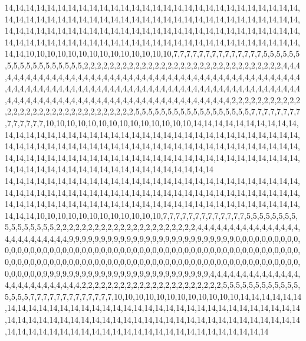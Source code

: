 14,14,14,14,14,14,14,14,14,14,14,14,14,14,14,14,14,14,14,14,14,14,14,14,14,14,14,14,14,14,14,14,14,14,14,14,14,14,14,14,14,14,14,14,14,14,14,14,14,14,14,14,14,14,14,14,14,14,14,14,14,14,14,14,14,14,14,14,14,14,14,14,14,14,14,14,14,14,14,14,14,14,14,14,14,14,14,14,14,14,14,14,14,14,14,14,14,14,14,14,14,14,14,14,14,14,14,14,14,14,14,14,14,14,10,10,10,10,10,10,10,10,10,10,10,10,10,10,7,7,7,7,7,7,7,7,7,7,7,7,7,7,5,5,5,5,5,5,5,5,5,5,5,5,5,5,5,5,5,5,2,2,2,2,2,2,2,2,2,2,2,2,2,2,2,2,2,2,2,2,2,2,2,2,2,2,2,2,2,2,2,4,4,4,4,4,4,4,4,4,4,4,4,4,4,4,4,4,4,4,4,4,4,4,4,4,4,4,4,4,4,4,4,4,4,4,4,4,4,4,4,4,4,4,4,4,4,4,4,4,4,4,4,4,4,4,4,4,4,4,4,4,4,4,4,4,4,4,4,4,4,4,4,4,4,4,4,4,4,4,4,4,4,4,4,4,4,4,4,4,4,4,4,4,4,4,4,4,4,4,4,4,4,4,4,4,4,4,4,4,4,4,4,4,4,4,4,4,4,4,4,4,4,4,4,4,4,4,4,4,4,2,2,2,2,2,2,2,2,2,2,2,2,2,2,2,2,2,2,2,2,2,2,2,2,2,2,2,2,2,2,2,5,5,5,5,5,5,5,5,5,5,5,5,5,5,5,5,5,5,7,7,7,7,7,7,7,7,7,7,7,7,7,7,10,10,10,10,10,10,10,10,10,10,10,10,10,10,14,14,14,14,14,14,14,14,14,14,14,14,14,14,14,14,14,14,14,14,14,14,14,14,14,14,14,14,14,14,14,14,14,14,14,14,14,14,14,14,14,14,14,14,14,14,14,14,14,14,14,14,14,14,14,14,14,14,14,14,14,14,14,14,14,14,14,14,14,14,14,14,14,14,14,14,14,14,14,14,14,14,14,14,14,14,14,14,14,14,14,14,14,14,14,14,14,14,14,14,14,14,14,14,14,14,14,14,14,14,14,14,14,14
14,14,14,14,14,14,14,14,14,14,14,14,14,14,14,14,14,14,14,14,14,14,14,14,14,14,14,14,14,14,14,14,14,14,14,14,14,14,14,14,14,14,14,14,14,14,14,14,14,14,14,14,14,14,14,14,14,14,14,14,14,14,14,14,14,14,14,14,14,14,14,14,14,14,14,14,14,14,14,14,14,14,14,14,14,14,14,10,10,10,10,10,10,10,10,10,10,10,10,7,7,7,7,7,7,7,7,7,7,7,7,7,5,5,5,5,5,5,5,5,5,5,5,5,5,5,5,5,2,2,2,2,2,2,2,2,2,2,2,2,2,2,2,2,2,2,2,2,2,2,4,4,4,4,4,4,4,4,4,4,4,4,4,4,4,4,4,4,4,4,4,4,4,4,4,4,9,9,9,9,9,9,9,9,9,9,9,9,9,9,9,9,9,9,9,9,9,9,9,9,9,9,0,0,0,0,0,0,0,0,0,0,0,0,0,0,0,0,0,0,0,0,0,0,0,0,0,0,0,0,0,0,0,0,0,0,0,0,0,0,0,0,0,0,0,0,0,0,0,0,0,0,0,0,0,0,0,0,0,0,0,0,0,0,0,0,0,0,0,0,0,0,0,0,0,0,0,0,0,0,0,0,0,0,0,0,0,0,0,0,0,0,0,0,0,0,0,0,0,0,0,0,0,0,0,0,0,0,0,0,9,9,9,9,9,9,9,9,9,9,9,9,9,9,9,9,9,9,9,9,9,9,9,9,9,9,4,4,4,4,4,4,4,4,4,4,4,4,4,4,4,4,4,4,4,4,4,4,4,4,4,4,2,2,2,2,2,2,2,2,2,2,2,2,2,2,2,2,2,2,2,2,2,2,5,5,5,5,5,5,5,5,5,5,5,5,5,5,5,5,7,7,7,7,7,7,7,7,7,7,7,7,7,10,10,10,10,10,10,10,10,10,10,10,10,14,14,14,14,14,14,14,14,14,14,14,14,14,14,14,14,14,14,14,14,14,14,14,14,14,14,14,14,14,14,14,14,14,14,14,14,14,14,14,14,14,14,14,14,14,14,14,14,14,14,14,14,14,14,14,14,14,14,14,14,14,14,14,14,14,14,14,14,14,14,14,14,14,14,14,14,14,14,14,14,14,14,14,14,14,14,14
